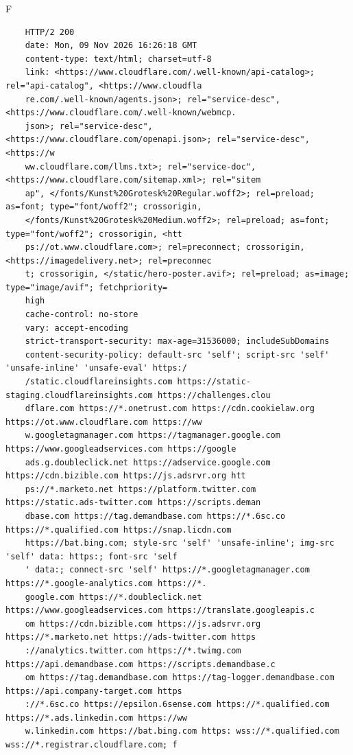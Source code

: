 \begin{maintask}{F}
\begin{termout}[H]
\begin{verbatim}
    HTTP/2 200 
    date: Mon, 09 Nov 2026 16:26:18 GMT
    content-type: text/html; charset=utf-8
    link: <https://www.cloudflare.com/.well-known/api-catalog>; rel="api-catalog", <https://www.cloudfla
    re.com/.well-known/agents.json>; rel="service-desc", <https://www.cloudflare.com/.well-known/webmcp.
    json>; rel="service-desc", <https://www.cloudflare.com/openapi.json>; rel="service-desc", <https://w
    ww.cloudflare.com/llms.txt>; rel="service-doc", <https://www.cloudflare.com/sitemap.xml>; rel="sitem
    ap", </fonts/Kunst%20Grotesk%20Regular.woff2>; rel=preload; as=font; type="font/woff2"; crossorigin,
    </fonts/Kunst%20Grotesk%20Medium.woff2>; rel=preload; as=font; type="font/woff2"; crossorigin, <htt
    ps://ot.www.cloudflare.com>; rel=preconnect; crossorigin, <https://imagedelivery.net>; rel=preconnec
    t; crossorigin, </static/hero-poster.avif>; rel=preload; as=image; type="image/avif"; fetchpriority=
    high
    cache-control: no-store
    vary: accept-encoding
    strict-transport-security: max-age=31536000; includeSubDomains
    content-security-policy: default-src 'self'; script-src 'self' 'unsafe-inline' 'unsafe-eval' https:/
    /static.cloudflareinsights.com https://static-staging.cloudflareinsights.com https://challenges.clou
    dflare.com https://*.onetrust.com https://cdn.cookielaw.org https://ot.www.cloudflare.com https://ww
    w.googletagmanager.com https://tagmanager.google.com https://www.googleadservices.com https://google
    ads.g.doubleclick.net https://adservice.google.com https://cdn.bizible.com https://js.adsrvr.org htt
    ps://*.marketo.net https://platform.twitter.com https://static.ads-twitter.com https://scripts.deman
    dbase.com https://tag.demandbase.com https://*.6sc.co https://*.qualified.com https://snap.licdn.com
    https://bat.bing.com; style-src 'self' 'unsafe-inline'; img-src 'self' data: https:; font-src 'self
    ' data:; connect-src 'self' https://*.googletagmanager.com https://*.google-analytics.com https://*.
    google.com https://*.doubleclick.net https://www.googleadservices.com https://translate.googleapis.c
    om https://cdn.bizible.com https://js.adsrvr.org https://*.marketo.net https://ads-twitter.com https
    ://analytics.twitter.com https://*.twimg.com https://api.demandbase.com https://scripts.demandbase.c
    om https://tag.demandbase.com https://tag-logger.demandbase.com https://api.company-target.com https
    ://*.6sc.co https://epsilon.6sense.com https://*.qualified.com https://*.ads.linkedin.com https://ww
    w.linkedin.com https://bat.bing.com https: wss://*.qualified.com wss://*.registrar.cloudflare.com; f

\end{verbatim}
\end{termout}
\end{maintask}
